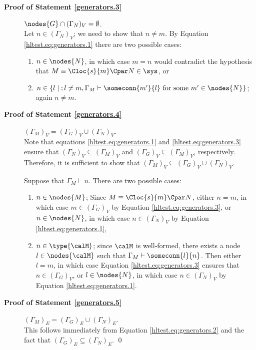 \documentclass{LMCS}
\begin{document}
\begin{description}
\begin{enumerate}
\end{enumerate}

\item[\textbf{Proof of Statement \ref{generators.3}}] $\nodes{G} \cap (\Gamma_N)_V = \emptyset$.\\
Let $n \in (\Gamma_N)_V$; we need to show that $n \neq m$. By Equation \ref{hltest.eq:generators.1} 
there are two possible cases:
\begin{enumerate}
\item $n \in \nodes{N}$, in which case $m = n$ would contradict the hypothesis that 
$M \equiv \Cloc{s}{m} \Cpar N \in \sys$, or 
\item $n \in \{l \;|\; ; l \neq m, \Gamma_M \vdash \someconn{m'}{l} \mbox{ for some } m' \in \nodes{N}\}$; 
again $n \neq m$.
\end{enumerate}

\item[\textbf{Proof of Statement \ref{generators.4}}] $(\Gamma_M)_V = (\Gamma_G)_V \cup (\Gamma_N)_V$.\\ 
Note that equations \eqref{hltest.eq:generators.1} and \eqref{hltest.eq:generators.3} ensure that 
$(\Gamma_N)_V \subseteq (\Gamma_M)_V$ and $(\Gamma_G)_V \subseteq (\Gamma_M)_V$, respectively. 
Therefore, it is sufficient to show that $(\Gamma_M)_V \subseteq (\Gamma_G)_V \cup (\Gamma_N)_V$. 

Suppose that $\Gamma_M \vdash n$. There are two possible cases:
\begin{enumerate}
\item $n \in \nodes{M}$; Since $M \equiv \Cloc{s}{m} \Cpar N$, either 
$n = m$, in which case $m \in (\Gamma_G)_V$ by Equation \eqref{hltest.eq:generators.3}, 
or $n \in \nodes{N}$, in which case $n \in (\Gamma_N)_V$ by Equation \eqref{hltest.eq:generators.1},

\item $n \in \type{\calM}$; since $\calM$ is well-formed, there exists a node $l \in \nodes{\calM}$ 
such that $\Gamma_M \vdash \someconn{l}{n}$. Then either $l = m$, in which case 
Equation \eqref{hltest.eq:generators.3} ensures that $n \in (\Gamma_G)_V$, or 
$l \in \nodes{N}$, in which case $n \in (\Gamma_N)_V$ by Equation \eqref{hltest.eq:generators.1}.
\end{enumerate}

\item[\textbf{Proof of Statement \ref{generators.5}}] $(\Gamma_M)_E = (\Gamma_G)_E \cup (\Gamma_N)_E$.\\ 
This follows immediately from Equation \eqref{hltest.eq:generators.2} and the fact that $(\Gamma_G)_E \subseteq 
(\Gamma_N)_E$. \hfill\qed
\end{description}
\end{document}
